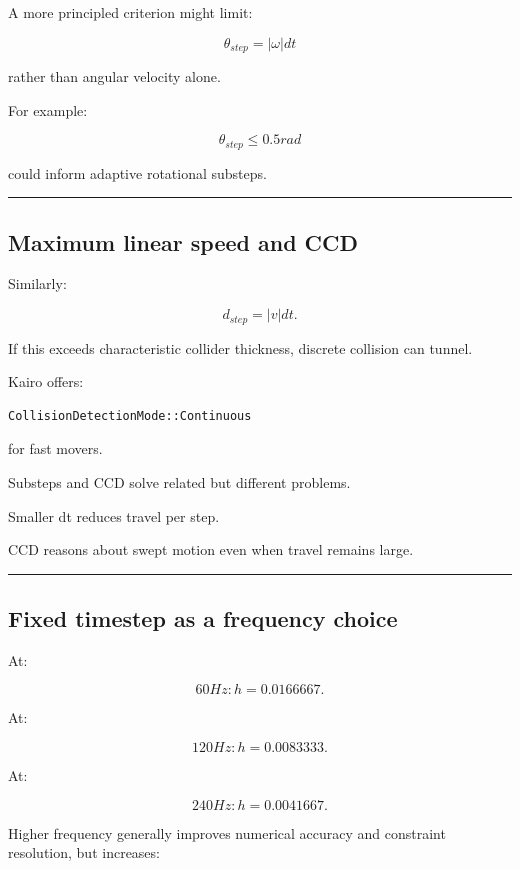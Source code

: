 A more principled criterion might limit:

\[
\theta_{step}
=
|\omega|dt
\]

rather than angular velocity alone.

For example:

\[
\theta_{step}\le0.5rad
\]

could inform adaptive rotational substeps.

\begin{center}\rule{0.5\linewidth}{0.5pt}\end{center}

\subsection{Maximum linear speed and CCD}\label{06-engine-ii-ch038-maximum-linear-speed-and-ccd}

Similarly:

\[
d_{step}
=
|v|dt.
\]

If this exceeds characteristic collider thickness, discrete collision can tunnel.

Kairo offers:

\begin{verbatim}
CollisionDetectionMode::Continuous
\end{verbatim}

for fast movers.

Substeps and CCD solve related but different problems.

Smaller dt reduces travel per step.

CCD reasons about swept motion even when travel remains large.

\begin{center}\rule{0.5\linewidth}{0.5pt}\end{center}

\subsection{Fixed timestep as a frequency choice}\label{06-engine-ii-ch038-fixed-timestep-as-a-frequency-choice}

At:

\[
60Hz:
h=0.0166667.
\]

At:

\[
120Hz:
h=0.0083333.
\]

At:

\[
240Hz:
h=0.0041667.
\]

Higher frequency generally improves numerical accuracy and constraint resolution, but increases:

